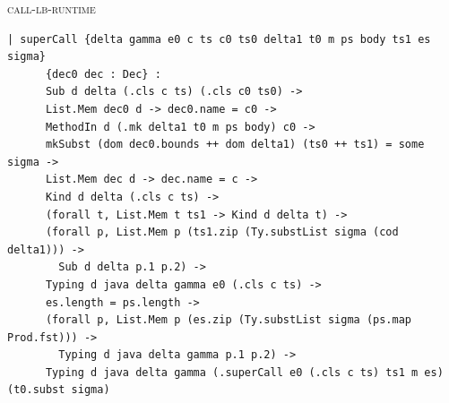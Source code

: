 \begin{cmp}{\textsc{call-lb-runtime}}
\begin{paperside}
\end{paperside}
\begin{leanside}
\begin{lstlisting}[style=leanside]
  | superCall {delta gamma e0 c ts c0 ts0 delta1 t0 m ps body ts1 es sigma}
      {dec0 dec : Dec} :
      Sub d delta (.cls c ts) (.cls c0 ts0) ->
      List.Mem dec0 d -> dec0.name = c0 ->
      MethodIn d (.mk delta1 t0 m ps body) c0 ->
      mkSubst (dom dec0.bounds ++ dom delta1) (ts0 ++ ts1) = some sigma ->
      List.Mem dec d -> dec.name = c ->
      Kind d delta (.cls c ts) ->
      (forall t, List.Mem t ts1 -> Kind d delta t) ->
      (forall p, List.Mem p (ts1.zip (Ty.substList sigma (cod delta1))) ->
        Sub d delta p.1 p.2) ->
      Typing d java delta gamma e0 (.cls c ts) ->
      es.length = ps.length ->
      (forall p, List.Mem p (es.zip (Ty.substList sigma (ps.map Prod.fst))) ->
        Typing d java delta gamma p.1 p.2) ->
      Typing d java delta gamma (.superCall e0 (.cls c ts) ts1 m es) (t0.subst sigma)
\end{lstlisting}
\end{leanside}
\end{cmp}

